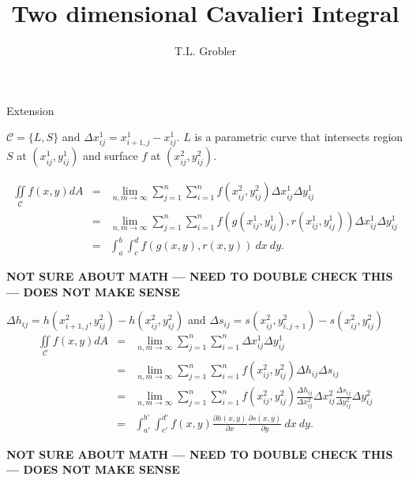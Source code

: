\documentclass[a4paper,10pt]{article}
\title{Two dimensional Cavalieri Integral}
\author{T.L. Grobler}
\begin{document}
\maketitle

\begin{section}{Extension}

$\mathcal{C} = \{L,S\}$ and $\Delta x_{ij}^1 = x_{i+1,j}^1 - x_{ij}^1$. $L$ is a parametric curve that intersects region $S$ at $(x_{ij}^1,y_{ij}^1)$ and surface 
$f$ at $(x_{ij}^2,y_{ij}^2)$.


\begin{eqnarray}
\iint\limits_{\!\mathcal{C}} f(x,y) dA &=& \lim_{n,m\rightarrow \infty} \sum_{j=1}^n\sum_{i=1}^n f(x_{ij}^2,y_{ij}^2) \Delta x_{ij}^1\Delta y_{ij}^1\\
&=&  \lim_{n,m\rightarrow \infty} \sum_{j=1}^n\sum_{i=1}^n f(g(x_{ij}^1,y_{ij}^1),r(x_{ij}^1,y_{ij}^1)) \Delta x_{ij}^1\Delta y_{ij}^1\\
&=& \int_a^b\int_c^d f(g(x,y),r(x,y))~dx~dy.
\end{eqnarray}

\noindent
\textbf{NOT SURE ABOUT MATH --- NEED TO DOUBLE CHECK THIS --- DOES NOT MAKE SENSE}


$\Delta h_{ij} = h(x_{i+1,j}^2,y_{ij}^2) - h(x_{ij}^2,y_{ij}^2)$ and $\Delta s_{ij} = s(x_{ij}^2,y_{i,j+1}^2) - s(x_{ij}^2,y_{ij}^2)$ 
\begin{eqnarray}
\iint\limits_{\!\mathcal{C}} f(x,y) dA &=& \lim_{n,m\rightarrow \infty} \sum_{j=1}^n\sum_{i=1}^n  \Delta x_{ij}^1\Delta y_{ij}^1\\
&=&  \lim_{n,m\rightarrow \infty} \sum_{j=1}^n\sum_{i=1}^n f(x_{ij}^2,y_{ij}^2) \Delta h_{ij}\Delta s_{ij}\\
&=&  \lim_{n,m\rightarrow \infty} \sum_{j=1}^n\sum_{i=1}^n f(x_{ij}^2,y_{ij}^2) \frac{\Delta h_{ij}}{\Delta x_{ij}^2}\Delta x_{ij}^2 \frac{\Delta s_{ij}}{\Delta y_{ij}^2}\Delta y_{ij}^2\\
&=& \int_{a'}^{b'}\int_{c'}^{d'} f(x,y)\frac{\partial h(x,y)}{\partial x}\frac{\partial s(x,y)}{\partial y}~dx~dy.
\end{eqnarray}

\noindent
\textbf{NOT SURE ABOUT MATH --- NEED TO DOUBLE CHECK THIS --- DOES NOT MAKE SENSE}

\end{section}
\end{document}
